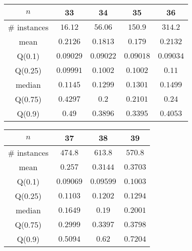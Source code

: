 \begin{tabular}{c|cccc} 
\hline 
$n$ & 33 & 34 & 35 & 36 \tabularnewline 
\hline 
\hline 
\# instances & $16.12$ & $56.06$ & $150.9$ & $314.2$ \tabularnewline 
mean & $0.2126$ & $0.1813$ & $0.179$ & $0.2132$ \tabularnewline 
Q(0.1) & $0.09029$ & $0.09022$ & $0.09018$ & $0.09034$ \tabularnewline 
Q(0.25) & $0.09991$ & $0.1002$ & $0.1002$ & $0.11$ \tabularnewline 
median & $0.1145$ & $0.1299$ & $0.1301$ & $0.1499$ \tabularnewline 
Q(0.75) & $0.4297$ & $0.2$ & $0.2101$ & $0.24$ \tabularnewline 
Q(0.9) & $0.49$ & $0.3896$ & $0.3395$ & $0.4053$ \tabularnewline 
\hline 
\end{tabular} 
\medskip{} 

\begin{tabular}{c|ccc} 
\hline 
$n$ & 37 & 38 & 39 \tabularnewline 
\hline 
\hline 
\# instances & $474.8$ & $613.8$ & $570.8$ \tabularnewline 
mean & $0.257$ & $0.3144$ & $0.3703$ \tabularnewline 
Q(0.1) & $0.09069$ & $0.09599$ & $0.1003$ \tabularnewline 
Q(0.25) & $0.1103$ & $0.1202$ & $0.1294$ \tabularnewline 
median & $0.1649$ & $0.19$ & $0.2001$ \tabularnewline 
Q(0.75) & $0.2999$ & $0.3397$ & $0.3798$ \tabularnewline 
Q(0.9) & $0.5094$ & $0.62$ & $0.7204$ \tabularnewline 
\hline 
\end{tabular} 
\medskip{} 

